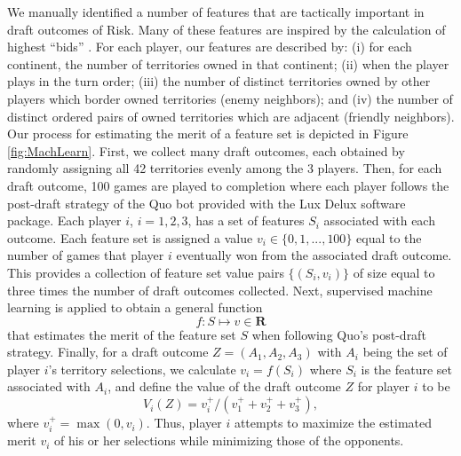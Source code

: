 \documentclass[letterpaper]{article}
\numberwithin{equation}{section}
\numberwithin{theorem}{section}
\numberwithin{lemma}{section}
\numberwithin{df}{section}
\begin{document}
We manually identified a number of features that are tactically important in draft outcomes of Risk.  Many of these features are inspired by the calculation of highest ``bids'' \cite{RiskBots}.  For each player, our features are described by: (i) for each continent, the number of territories owned in that continent; (ii) when the player plays in the turn order; (iii) the number of distinct territories owned by other players which border owned territories (enemy neighbors); and (iv) the number of distinct ordered pairs of owned territories which are adjacent (friendly neighbors).  Our process for estimating the merit of a feature set is depicted in Figure \ref{fig:MachLearn}.  First, we collect many draft outcomes, each obtained by randomly assigning all 42 territories evenly among the 3 players.  Then, for each draft outcome, 100 games are played to completion where each player follows the post-draft strategy of the Quo bot provided with the Lux Delux software package.  Each player $i$, $i=1,2,3$, has a set of features $S_i$ associated with each outcome.  Each feature set is assigned a value $v_i \in \{0,1,...,100\}$ equal to the number of games that player $i$ eventually won from the associated draft outcome.  This provides a collection of feature set value pairs $\{(S_i, v_i)\}$ of size equal to three times the number of draft outcomes collected.  Next, supervised machine learning is applied to obtain a general function
\[ f: S \mapsto v \in \textbf{R} \] 
that estimates the merit of the feature set $S$ when following Quo's post-draft strategy.  Finally, for a draft outcome $Z = (A_1,A_2,A_3)$ with $A_i$ being the set of player $i$'s territory selections, we calculate $v_i = f(S_i)$ where $S_i$ is the feature set associated with $A_i$, and define the value of the draft outcome $Z$ for player $i$ to be
\[ V_i(Z) = v_i^+ / \left(v_1^+ + v_2^+ + v_3^+\right), \]
where $v_i^+ = \max(0, v_i)$.  
Thus, player $i$ attempts to maximize the estimated merit $v_i$ of his or her selections while minimizing those of the opponents.
\end{document}
